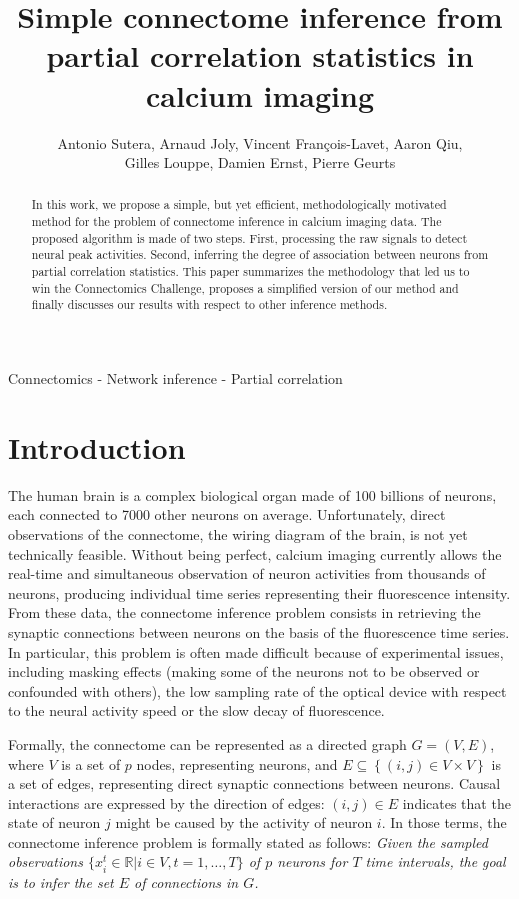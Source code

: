 \documentclass[wcp]{jmlr}
\title{Simple connectome inference from partial correlation statistics in calcium imaging}
\author{Antonio Sutera,
        Arnaud Joly,
        Vincent François-Lavet,
        Aaron Qiu, \\
        Gilles Louppe,
        Damien Ernst,
        Pierre Geurts}
\begin{document}
\maketitle

\begin{abstract} In this work, we propose a simple, but yet efficient,
methodologically motivated method for the problem of connectome inference in
calcium imaging data. The proposed algorithm is made of two steps. First,
processing the raw signals to detect neural peak activities. Second, inferring
the degree of association between neurons from partial correlation statistics.
This paper summarizes the methodology that led us to win the Connectomics
Challenge, proposes a simplified version of our method and finally discusses
our results with respect to other inference methods.\end{abstract}

\begin{keywords}
Connectomics - Network inference - Partial correlation
\end{keywords}


\section{Introduction}\label{sec:intro}

The human brain is a complex biological
organ made of 100 billions of neurons, each connected to 7000 other neurons on
average. Unfortunately, direct observations of the connectome, the wiring
diagram of the brain, is not yet technically feasible. Without being perfect,
calcium imaging currently allows the real-time and simultaneous observation of
neuron activities from thousands of neurons, producing individual time series
representing their fluorescence intensity. From these data, the connectome
inference problem consists in retrieving the synaptic connections between
neurons on the basis of the fluorescence time series. In particular, this
problem is often made difficult because of experimental issues, including
masking effects (making some of the neurons not to be observed or confounded
with others), the low sampling rate of the optical device with respect to the
neural activity speed or the slow decay of fluorescence.

Formally, the connectome can be represented as a directed graph $G=(V,E)$,
where $V$ is a set of $p$ nodes, representing neurons, and $E \subseteq
\left\{(i, j) \in V \times V\right\}$ is a set of edges, representing direct
synaptic connections between neurons. Causal interactions are expressed by the
direction of edges: $(i, j) \in E$ indicates that the state of neuron $j$ might
be caused by the activity of neuron $i$. In those terms,  the connectome
inference problem is formally stated as follows:  \textit{Given the sampled
observations $\{ x^t_i \in \mathbb{R} | i \in V, t = 1, \dots, T \}$ of $p$
neurons for $T$ time intervals, the goal is to infer the set $E$ of connections in $G$.}
\end{document}
